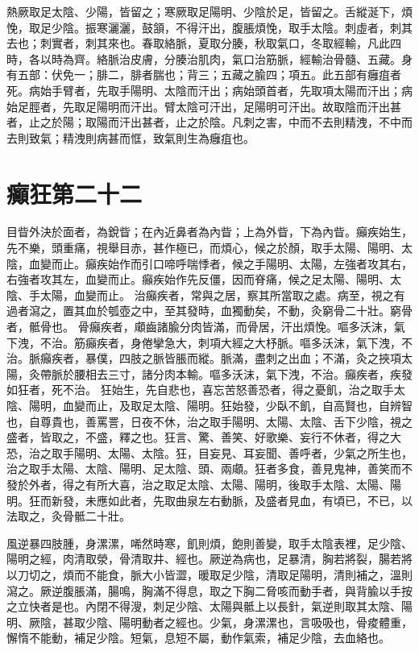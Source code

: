 熱厥取足太陰、少陽，皆留之；寒厥取足陽明、少陰於足，皆留之。舌縱涎下，煩悗，取足少陰。振寒灑灑，鼓頷，不得汗出，腹脹煩悗，取手太陰。刺虛者，刺其去也；刺實者，刺其來也。春取絡脈，夏取分腠，秋取氣口，冬取經輸，凡此四時，各以時為齊。絡脈治皮膚，分腠治肌肉，氣口治筋脈，經輸治骨髓、五藏。身有五部：伏免一；腓二，腓者腨也；背三；五藏之腧四；項五。此五部有癰疽者死。病始手臂者，先取手陽明、太陰而汗出；病始頭首者，先取項太陽而汗出；病始足脛者，先取足陽明而汗出。臂太陰可汗出，足陽明可汗出。故取陰而汗出甚者，止之於陽；取陽而汗出甚者，止之於陰。凡刺之害，中而不去則精洩，不中而去則致氣；精洩則病甚而恇，致氣則生為癰疽也。

\section{癲狂第二十二}

目眥外決於面者，為銳眥；在內近鼻者為內眥；上為外眥，下為內眥。癲疾始生，先不樂，頭重痛，視舉目赤，甚作極已，而煩心，候之於顏，取手太陽、陽明、太陰，血變而止。癲疾始作而引口啼呼喘悸者，候之手陽明、太陽，左強者攻其右，右強者攻其左，血變而止。癲疾始作先反僵，因而脊痛，候之足太陽、陽明、太陰、手太陽，血變而止。
治癲疾者，常與之居，察其所當取之處。病至，視之有過者瀉之，置其血於瓠壺之中，至其發時，血獨動矣，不動，灸窮骨二十壯。窮骨者，骶骨也。
骨癲疾者，顑齒諸腧分肉皆滿，而骨居，汗出煩悗。嘔多沃沫，氣下洩，不治。筋癲疾者，身倦攣急大，刺項大經之大杼脈。嘔多沃沫，氣下洩，不治。脈癲疾者，暴僕，四肢之脈皆脹而縱。脈滿，盡刺之出血；不滿，灸之挾項太陽，灸帶脈於腰相去三寸，諸分肉本輸。嘔多沃沫，氣下洩，不治。癲疾者，疾發如狂者，死不治。
狂始生，先自悲也，喜忘苦怒善恐者，得之憂飢，治之取手太陰、陽明，血變而止，及取足太陰、陽明。狂始發，少臥不飢，自高賢也，自辨智也，自尊貴也，善罵詈，日夜不休，治之取手陽明、太陽、太陰、舌下少陰，視之盛者，皆取之，不盛，釋之也。狂言、驚、善笑、好歌樂、妄行不休者，得之大恐，治之取手陽明、太陽、太陰。狂，目妄見、耳妄聞、善呼者，少氣之所生也，治之取手太陽、太陰、陽明、足太陰、頭、兩顑。狂者多食，善見鬼神，善笑而不發於外者，得之有所大喜，治之取足太陰、太陽、陽明，後取手太陰、太陽、陽明。狂而新發，未應如此者，先取曲泉左右動脈，及盛者見血，有頃已，不已，以法取之，灸骨骶二十壯。

風逆暴四肢腫，身漯漯，唏然時寒，飢則煩，飽則善變，取手太陰表裡，足少陰、陽明之經，肉清取滎，骨清取井、經也。厥逆為病也，足暴清，胸若將裂，腸若將以刀切之，煩而不能食，脈大小皆澀，暖取足少陰，清取足陽明，清則補之，溫則瀉之。厥逆腹脹滿，腸鳴，胸滿不得息，取之下胸二脅咳而動手者，與背腧以手按之立快者是也。內閉不得溲，刺足少陰、太陽與骶上以長針，氣逆則取其太陰、陽明、厥陰，甚取少陰、陽明動者之經也。少氣，身漯漯也，言吸吸也，骨痠體重，懈惰不能動，補足少陰。短氣，息短不屬，動作氣索，補足少陰，去血絡也。




